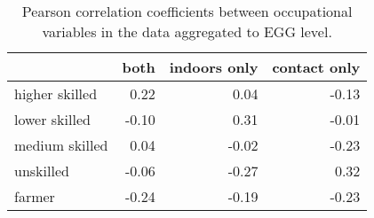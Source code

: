 \begin{table}

\caption{\label{tab:tab:occcor}Pearson correlation coefficients between occupational variables in the data aggregated to EGG level.}
\centering
\begin{tabular}[t]{l|r|r|r}
\hline
  & both & indoors only & contact only\\
\hline
higher skilled & 0.22 & 0.04 & -0.13\\
\hline
lower skilled & -0.10 & 0.31 & -0.01\\
\hline
medium skilled & 0.04 & -0.02 & -0.23\\
\hline
unskilled & -0.06 & -0.27 & 0.32\\
\hline
farmer & -0.24 & -0.19 & -0.23\\
\hline
\end{tabular}
\end{table}
